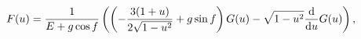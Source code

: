 \begin{equation}
\label{F}
F(u) = \frac{1}{E + g \cos f}\left(
\left(
-\frac{3 (1 + u)}{2 \sqrt{1-u^2}} + g \sin f
\right) G(u) 
- \sqrt{1 - u^2} \frac{{\rm d}}{{\rm d}u} G(u)
\right),
\end{equation} 
